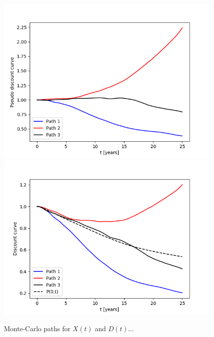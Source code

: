 \begin{figure}
\centering
\includegraphics[scale=0.7]{figures/pseudo_discount_paths.png}
\includegraphics[scale=0.7]{figures/discount_paths.png}
\caption{Monte-Carlo paths for $X(t)$ and $D(t)$...}
\end{figure}

